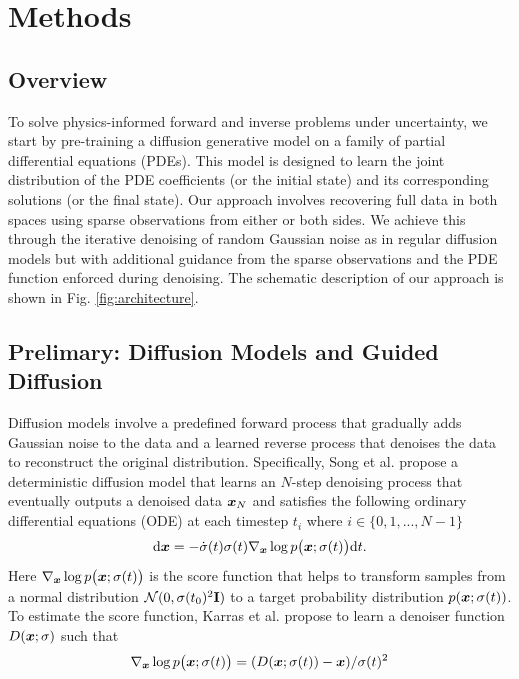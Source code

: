 \section{Methods}\label{sec:methods}

\subsection{Overview}

To solve physics-informed forward and inverse problems under uncertainty, we start by pre-training a diffusion generative model on a family of partial differential equations (PDEs). This model is designed to learn the joint distribution of the PDE coefficients (or the initial state) and its corresponding solutions (or the final state). Our approach involves recovering full data in both spaces using sparse observations from either or both sides. We achieve this through the iterative denoising of random Gaussian noise as in regular diffusion models but with additional guidance from the sparse observations and the PDE function enforced during denoising. The schematic description of our approach is shown in Fig. \ref{fig:architecture}.

\subsection{Prelimary: Diffusion Models and Guided Diffusion}

Diffusion models involve a predefined forward process that gradually adds Gaussian noise to the data and a learned reverse process that denoises the data to reconstruct the original distribution. Specifically, Song et al. \cite{song2021scorebased} propose a deterministic diffusion model that learns an $N$-step denoising process that eventually outputs a denoised data $\boldsymbol{x}_N$ and satisfies the following ordinary differential equations (ODE) at each timestep $t_i$ where $i\in \{0,1,...,N-1\}$
\begin{equation}
    \label{eq:ode}
    \mathrm{d}\boldsymbol{x}=-\dot{\sigma}(t) \sigma(t) \nabla_{\boldsymbol{x}}\log p\big(\boldsymbol{x};\sigma(t)\big) \mathrm{d}t.
\end{equation}
Here $\nabla_{\boldsymbol{x}}\log p\big(\boldsymbol{x};\sigma(t)\big)$  is the score function \cite{hyvarinen2005estimation} that helps to transform samples from a normal distribution $\mathcal{N}(0,\sigma(t_0)^2\mathbf{I})$ to a target probability distribution $p(\boldsymbol{x};\sigma(t))$. To estimate the score function, Karras et al. \cite{Karras2022edm} propose to learn a denoiser function $D(\boldsymbol{x};\sigma)$ such that
\begin{equation}
    \nabla_{\boldsymbol{x}}\log p\big(\boldsymbol{x};\sigma(t)\big)=(D(\boldsymbol{x};\sigma(t))-\boldsymbol{x})/\sigma(t)^2
\end{equation}

